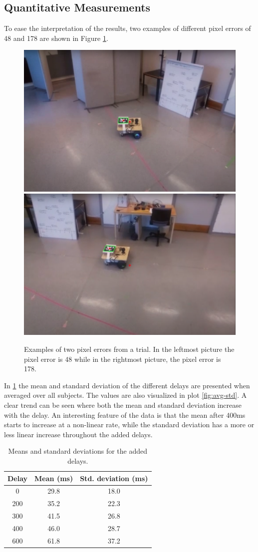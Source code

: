 \documentclass[nofilelist]{cslthse-msc}
\begin{document}
\subsection{Quantitative Measurements}
To ease the interpretation of the results, two examples of different pixel errors of 48 and 178 are shown in Figure \ref{fig:pixel-error}. 

\begin{figure}[htp]
   \centering
   \includegraphics[width=.47\textwidth]{images/pixel-error-low.png}\hfill
   \includegraphics[width=.47\textwidth]{images/pixel-error-high.png}
   \caption{Examples of two pixel errors from a trial. In the leftmost picture the pixel error is 48 while in the rightmost picture, the pixel error is 178.}
   \label{fig:pixel-error}
\end{figure}

In \ref{tab:averages} the mean and standard deviation of the different delays are presented when averaged over all subjects. The values are also visualized in plot \ref{fig:avg-std}. A clear trend can be seen where both the mean and standard deviation increase with the delay. An interesting feature of the data is that the mean after 400ms starts to increase at a non-linear rate, while the standard deviation has a more or less linear increase throughout the added delays.

\begin{table}[ht]
   \centering
   \begin{tabular}{|c|c|c|}
   \hline
   \textbf{Delay} & \textbf{ Mean (ms)} & \textbf{Std. deviation (ms)} \\
   \hline
   0 & 29.8 & 18.0 \\ \hline
   200 & 35.2 & 22.3 \\ \hline
   300 & 41.5 & 26.8 \\ \hline
   400 & 46.0 & 28.7 \\ \hline
   600 & 61.8 & 37.2 \\ \hline
   \end{tabular}
   \caption{Means and standard deviations for the added delays.}
   \label{tab:averages}
\end{table}
\end{document}
